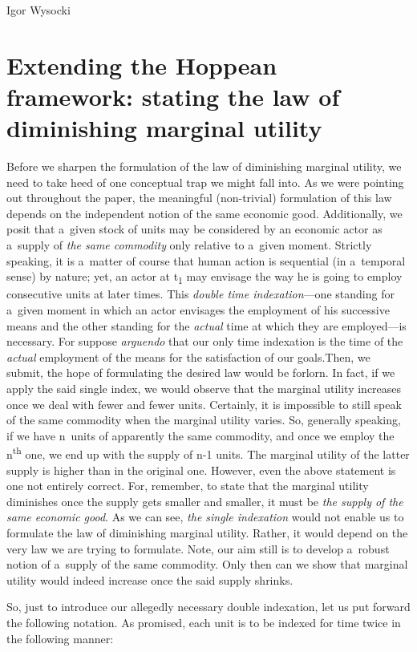 \begin{artengenv}{Igor Wysocki}
\section{Extending the Hoppean framework: stating the law of diminishing marginal utility }
Before we sharpen the formulation of the law of diminishing marginal utility, we need to take heed of one conceptual trap we might fall into. As we were pointing out throughout the paper, the meaningful (non-trivial) formulation of this law depends on the independent notion of the same economic good. Additionally, we posit that a~given stock of units may be considered by an economic actor as a~supply of \textit{the same commodity} only relative to a~given moment. Strictly speaking, it is a~matter of course that human action is sequential (in a~temporal sense) by nature; yet, an actor at t\textsubscript{1} may envisage the way he is going to employ consecutive units at later times. This \textit{double time indexation}---one standing for a~given moment in which an actor envisages the employment of his successive means and the other standing for the \textit{actual} time at which they are employed---is necessary. For suppose \textit{arguendo} that our only time indexation is the time of the \textit{actual} employment of the means for the satisfaction of our goals.Then, we submit, the hope of formulating the desired law would be forlorn. In fact, if we apply the said single index, we would observe that the marginal utility increases once we deal with fewer and fewer units. Certainly, it is impossible to still speak of the same commodity when the marginal utility varies. So, generally speaking, if we have n~units of apparently the same commodity, and once we employ the n\textsuperscript{th} one, we end up with the supply of n-1 units. The marginal utility of the latter supply is higher than in the original one. However, even the above statement is one not entirely correct. For, remember, to state that the marginal utility diminishes once the supply gets smaller and smaller, it must be \textit{the supply of the same economic good}. As we can see, \textit{the single indexation} would not enable us to formulate the law of diminishing marginal utility. Rather, it would depend on the very law we are trying to formulate. Note, our aim still is to develop a~robust notion of a~supply of the same commodity. Only then can we show that marginal utility would indeed increase once the said supply shrinks.

So, just to introduce our allegedly necessary double indexation, let us put forward the following notation. As promised, each unit is to be indexed for time twice in the following manner:


\end{artengenv}
